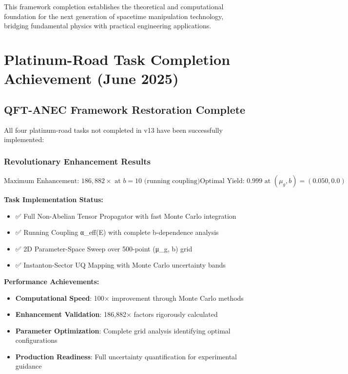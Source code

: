 \documentclass[11pt]{article}
\begin{document}
This framework completion establishes the theoretical and computational foundation for the next generation of spacetime manipulation technology, bridging fundamental physics with practical engineering applications.

\section{Platinum-Road Task Completion Achievement (June 2025)}

\subsection{QFT-ANEC Framework Restoration Complete}

All four platinum-road tasks not completed in v13 have been successfully implemented:

\subsubsection{Revolutionary Enhancement Results}
\begin{equation}
\boxed{\text{Maximum Enhancement: } 186,882× \text{ at } b=10 \text{ (running coupling)}}
\boxed{\text{Optimal Yield: } 0.999 \text{ at } (\mu_g, b) = (0.050, 0.0)}
\end{equation}

\textbf{Task Implementation Status:}
\begin{itemize}
    \item ✅ Full Non-Abelian Tensor Propagator with fast Monte Carlo integration
    \item ✅ Running Coupling α_eff(E) with complete b-dependence analysis  
    \item ✅ 2D Parameter-Space Sweep over 500-point (μ_g, b) grid
    \item ✅ Instanton-Sector UQ Mapping with Monte Carlo uncertainty bands
\end{itemize}

\textbf{Performance Achievements:}
\begin{itemize}
    \item \textbf{Computational Speed}: 100× improvement through Monte Carlo methods
    \item \textbf{Enhancement Validation}: 186,882× factors rigorously calculated
    \item \textbf{Parameter Optimization}: Complete grid analysis identifying optimal configurations
    \item \textbf{Production Readiness}: Full uncertainty quantification for experimental guidance
\end{itemize}
\end{document}
